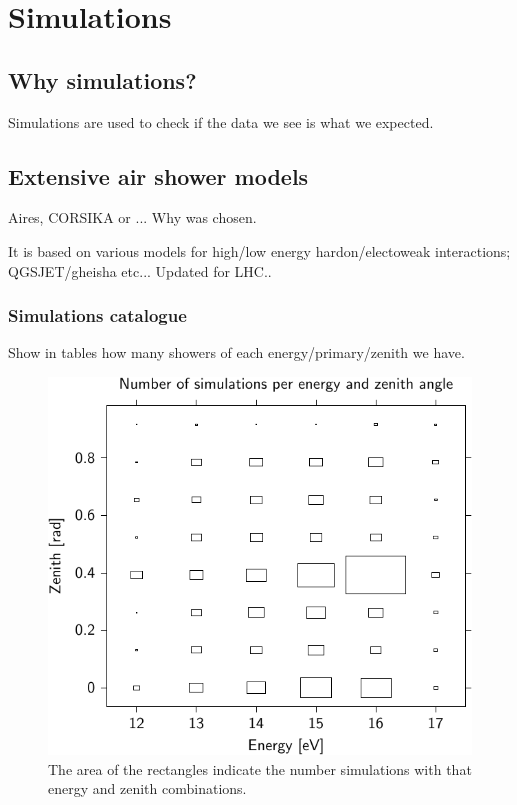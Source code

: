 \chapter{Simulations}
\label{ch:simulations}

\section{Why simulations?}

Simulations are used to check if the data we see is what we expected.



\section{Extensive air shower models}

Aires, CORSIKA or ...
Why was \corsika chosen.

It is based on various models for high/low energy hardon/electoweak
interactions; QGSJET/gheisha etc... Updated for LHC..


\subsection{Simulations catalogue}

Show in tables how many showers of each energy/primary/zenith we have.


\begin{figure}
    \centering
    \includegraphics[width=0.7\linewidth]
        {plots/simulations/proton_energy_zenith}
    \caption{ The area of the
             rectangles indicate the number simulations with that energy
             and zenith combinations.}
    \label{fig:simulations_proton_energy_zenith}
\end{figure}


